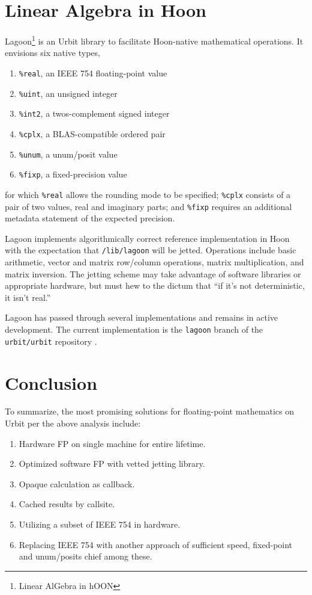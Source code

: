 \documentclass[twoside]{article}
\begin{document}
\section{Linear Algebra in Hoon}

Lagoon\footnote{Linear AlGebra in hOON} is an Urbit library to facilitate Hoon-native mathematical operations.  It envisions six native types,

\begin{enumerate}
  \item  \texttt{\%real}, an IEEE 754 floating-point value
  \item  \texttt{\%uint}, an unsigned integer
  \item  \texttt{\%int2}, a twos-complement signed integer
  \item  \texttt{\%cplx}, a BLAS-compatible ordered pair
  \item  \texttt{\%unum}, a unum/posit value
  \item  \texttt{\%fixp}, a fixed-precision value
\end{enumerate}

\noindent
for which \texttt{\%real} allows the rounding mode to be specified; \texttt{\%cplx} consists of a pair of two values, real and imaginary parts; and \texttt{\%fixp} requires an additional metadata statement of the expected precision.

Lagoon implements algorithmically correct reference implementation in Hoon with the expectation that \texttt{/lib/lagoon} will be jetted.  Operations include basic arithmetic, vector and matrix row/column operations, matrix multiplication, and matrix inversion.  The jetting scheme may take advantage of software libraries or appropriate hardware, but must hew to the dictum that “if it's not deterministic, it isn't real.”

Lagoon has passed through several implementations and remains in active development.  The current implementation is the \texttt{lagoon} branch of the \texttt{urbit/urbit} repository \citep{Urbit}.


\section{Conclusion}

To summarize, the most promising solutions for floating-point mathematics on Urbit per the above analysis include:

\begin{enumerate}
  \item  Hardware FP on single machine for entire lifetime.
  \item  Optimized software FP with vetted jetting library.
  \item  Opaque calculation as callback.
  \item  Cached results by callsite.
  \item  Utilizing a subset of IEEE 754 in hardware.
  \item  Replacing IEEE 754 with another approach of sufficient speed, fixed-point and unum/posits chief among these.
\end{enumerate}
\end{document}
